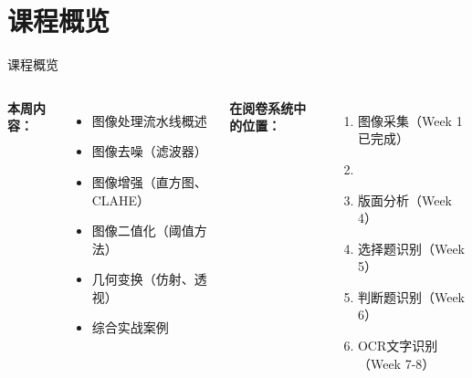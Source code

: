 \documentclass[aspectratio=169, 10pt]{beamer}
\begin{document}
\section*{课程概览}
\begin{frame}{课程概览}
    \begin{columns}
        \textbf{本周内容：}
        \begin{itemize}
            \item 图像处理流水线概述
            \item 图像去噪（滤波器）
            \item 图像增强（直方图、CLAHE）
            \item 图像二值化（阈值方法）
            \item 几何变换（仿射、透视）
            \item 综合实战案例
        \end{itemize}

        \textbf{在阅卷系统中的位置：}
        \begin{enumerate}
            \item 图像采集（Week 1 已完成）
            \item {}
            \item 版面分析（Week 4）
            \item 选择题识别（Week 5）
            \item 判断题识别（Week 6）
            \item OCR文字识别（Week 7-8）
        \end{enumerate}
    \end{columns}
\end{frame}
\end{document}
